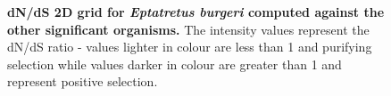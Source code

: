 \documentclass{article}
\begin{document}
\begin{figure}[H]
\centering
{}
\caption{\textbf{dN/dS 2D grid for \textit{Eptatretus burgeri} computed against the other significant organisms.} The intensity values represent the dN/dS ratio - values lighter in colour are less than 1 and purifying selection while values darker in colour are greater than 1 and represent positive selection.}
\label{sup_fig_25}
\end{figure}
\end{document}
